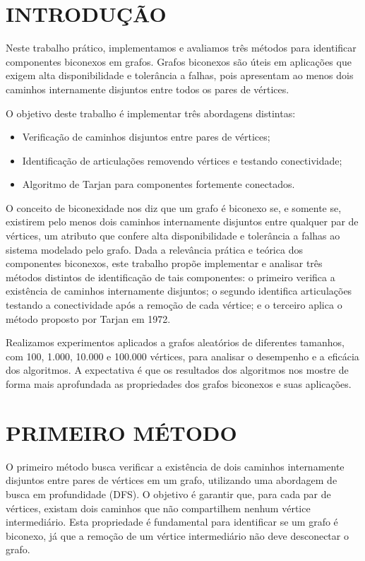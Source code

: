 

\chapter{INTRODUÇÃO}

Neste trabalho prático, implementamos e avaliamos três métodos para identificar componentes biconexos em grafos. Grafos biconexos são úteis em aplicações que exigem alta disponibilidade e tolerância a falhas, pois apresentam ao menos dois caminhos internamente disjuntos entre todos os pares de vértices.

O objetivo deste trabalho é implementar três abordagens distintas:
\begin{itemize}
    \item Verificação de caminhos disjuntos entre pares de vértices;
    \item Identificação de articulações removendo vértices e testando conectividade;
    \item Algoritmo de Tarjan para componentes fortemente conectados.
\end{itemize}

O conceito de biconexidade nos diz que um grafo é biconexo se, e somente se, existirem pelo menos dois caminhos internamente disjuntos entre qualquer par de vértices, um atributo que confere alta disponibilidade e tolerância a falhas ao sistema modelado pelo grafo. Dada a relevância prática e teórica dos componentes biconexos, este trabalho propõe implementar e analisar três métodos distintos de identificação de tais componentes: o primeiro verifica a existência de caminhos internamente disjuntos; o segundo identifica articulações testando a conectividade após a remoção de cada vértice; e o terceiro aplica o método proposto por Tarjan em 1972.
\par Realizamos experimentos aplicados a grafos aleatórios de diferentes tamanhos, com 100, 1.000, 10.000 e 100.000 vértices, para analisar o desempenho e a eficácia dos algoritmos.
A expectativa é que os resultados dos algoritmos nos mostre de forma mais aprofundada as propriedades dos grafos biconexos e suas aplicações.

\chapter{PRIMEIRO MÉTODO}
\par
O primeiro método busca verificar a existência de dois caminhos internamente disjuntos entre pares de vértices em um grafo, utilizando uma abordagem de busca em profundidade (DFS). O objetivo é garantir que, para cada par de vértices, existam dois caminhos que não compartilhem nenhum vértice intermediário. Esta propriedade é fundamental para identificar se um grafo é biconexo, já que a remoção de um vértice intermediário não deve desconectar o grafo.

